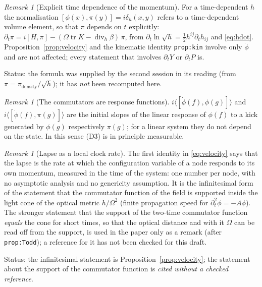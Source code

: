 \documentclass[a4paper,11pt]{article}
\theoremstyle{definition}
\theoremstyle{remark}
\newtheorem{remark}[theorem]{Remark}
\DeclareMathOperator{\tr}{tr}
\newcommand{\status}[1]{\par\noindent\textsf{\small Status: #1}\par}
\begin{document}
\begin{remark}[Explicit time dependence of the momentum]
For a time-dependent $h$ the normalisation $[\phi(x),\pi(y)]=i\delta_h(x,y)$ refers to a time-dependent volume element, so that $\pi$ depends on $t$ explicitly: $\partial_t\pi=i[H,\pi]-(\Omega\tr K-\operatorname{div}_h\beta)\,\pi$, from $\partial_t\ln\sqrt h=\tfrac12h^{ij}\partial_th_{ij}$ and \eqref{eq:hdot}. Proposition~\ref{prop:velocity} and the kinematic identity \texttt{prop:kin} involve only $\dot\phi$ and are not affected; every statement that involves $\partial_tY$ or $\partial_tP$ is.
\end{remark}
\status{the formula was supplied by the second session in its reading (from $\pi=\pi_{\mathrm{density}}/\sqrt h$); it has \emph{not} been recomputed here.}

\begin{remark}[The commutators are response functions]
$i\langle[\dot\phi(f),\phi(g)]\rangle$ and $i\langle[\dot\phi(f),\pi(g)]\rangle$ are the initial slopes of the linear response of $\phi(f)$ to a kick generated by $\phi(g)$ respectively $\pi(g)$; for a linear system they do not depend on the state. In this sense \textup{(D3)} is in principle measurable.
\end{remark}

\begin{remark}[Lapse as a local clock rate]
The first identity in \eqref{eq:velocity} says that the lapse is the rate at which the configuration variable of a node responds to its own momentum, measured in the time of the system: one number per node, with no asymptotic analysis and no genericity assumption. It is the infinitesimal form of the statement that the commutator function of the field is supported inside the light cone of the optical metric $h/\Omega^2$ (finite propagation speed for $\partial_t^2\phi=-A\phi$). The stronger statement that the support of the two-time commutator function \emph{equals} the cone for short times, so that the optical distance and with it $\Omega$ can be read off from the support, is used in the paper only as a remark (after \texttt{prop:Todd}); a reference for it has not been checked for this draft.
\end{remark}
\status{the infinitesimal statement is Proposition~\ref{prop:velocity}; the statement about the support of the commutator function is \emph{cited without a checked reference}.}
\end{document}
